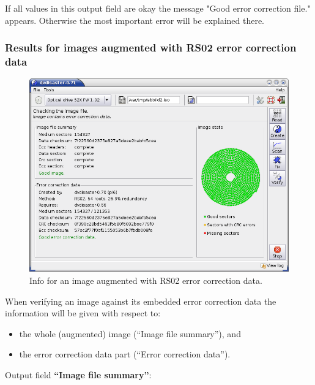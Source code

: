 \medskip

If all values in this output field are okay the 
message "\textcolor{dkgreen}{Good error correction file.}" appears. Otherwise 
the most important error will be explained there. 

\newpage
 	
\subsubsection{Results for images augmented with RS02 error correction data}
\label{howto-info-rs02}

\begin{figure}[h]
\centerline{\includegraphics[width=\textwidth]{screenshots/info-okay-rs02.png}}
\caption{Info for an image augmented with RS02 error correction data.}
\label{howto-info-good-rs02}
\end{figure}

When verifying an image against its embedded error correction data the 
information will be given with respect to:

\begin{itemize}
\item the whole (augmented) image (``Image file summary''), and
\item the error correction data part (``Error correction data'').
\end{itemize}

\bigskip

Output field {\bf ``Image file summary''}:

\medskip

